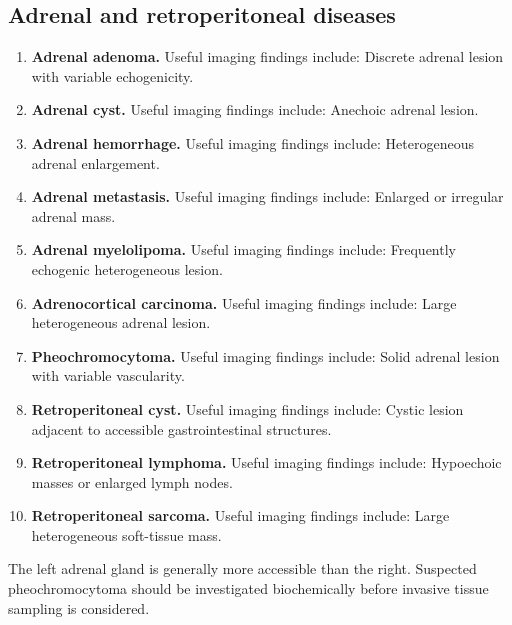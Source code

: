 \subsection{Adrenal and retroperitoneal diseases}
\begin{enumerate}[leftmargin=*,itemsep=0.45em,topsep=0.4em]
\item \textbf{Adrenal adenoma.} Useful imaging findings include: Discrete adrenal lesion with variable echogenicity.
\item \textbf{Adrenal cyst.} Useful imaging findings include: Anechoic adrenal lesion.
\item \textbf{Adrenal hemorrhage.} Useful imaging findings include: Heterogeneous adrenal enlargement.
\item \textbf{Adrenal metastasis.} Useful imaging findings include: Enlarged or irregular adrenal mass.
\item \textbf{Adrenal myelolipoma.} Useful imaging findings include: Frequently echogenic heterogeneous lesion.
\item \textbf{Adrenocortical carcinoma.} Useful imaging findings include: Large heterogeneous adrenal lesion.
\item \textbf{Pheochromocytoma.} Useful imaging findings include: Solid adrenal lesion with variable vascularity.
\item \textbf{Retroperitoneal cyst.} Useful imaging findings include: Cystic lesion adjacent to accessible gastrointestinal structures.
\item \textbf{Retroperitoneal lymphoma.} Useful imaging findings include: Hypoechoic masses or enlarged lymph nodes.
\item \textbf{Retroperitoneal sarcoma.} Useful imaging findings include: Large heterogeneous soft-tissue mass.
\end{enumerate}
The left adrenal gland is generally more accessible than the right. Suspected pheochromocytoma should be investigated biochemically before invasive tissue sampling is considered.

